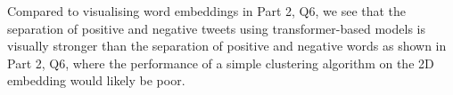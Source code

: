 Compared to visualising word embeddings in Part 2, Q6, we see that the separation of positive and negative tweets using transformer-based models is visually stronger than the separation of positive and negative words as shown in Part 2, Q6, where the performance of a simple clustering algorithm on the 2D embedding would likely be poor.
